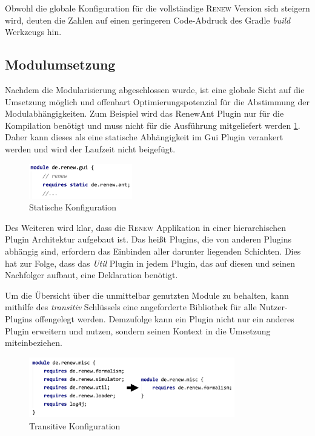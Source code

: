 	Obwohl die globale Konfiguration für die vollständige \textsc{Renew} Version sich steigern wird, deuten die Zahlen auf einen geringeren Code-Abdruck des Gradle \textit{build} Werkzeugs hin.\bigbreak

\subsection{Modulumsetzung} \label{sub:optimierung}%
	Nachdem die Modularisierung abgeschlossen wurde, ist eine globale Sicht auf die Umsetzung möglich und offenbart Optimierungspotenzial für die Abstimmung der Modulabhängigkeiten. Zum Beispiel wird das RenewAnt Plugin nur für die Kompilation benötigt und muss nicht für die Ausführung mitgeliefert werden \ref{fig:remote_config}. Daher kann dieses als eine statische Abhängigkeit im Gui Plugin verankert werden und wird der Laufzeit nicht beigefügt.\bigbreak

	\begin{figure}[h!]
	  \centering
	  \includegraphics[width=0.4\textwidth]{material/images/gui_config.png}
	  \caption{Statische Konfiguration}
	  \label{fig:remote_config}
	\end{figure}

	Des Weiteren wird klar, dass die \textsc{Renew} Applikation in einer hierarchischen Plugin Architektur aufgebaut ist. Das heißt Plugins, die von anderen Plugins abhängig sind, erfordern das Einbinden aller darunter liegenden Schichten. Dies hat zur Folge, dass das \textit{Util} Plugin in jedem Plugin, das auf diesen und seinen Nachfolger aufbaut, eine Deklaration benötigt. \newline

	Um die Übersicht über die unmittelbar genutzten Module zu behalten, kann mithilfe des \textit{transitiv}  Schlüssels eine angeforderte Bibliothek für alle Nutzer-Plugins offengelegt werden. Demzufolge kann ein Plugin nicht nur ein anderes Plugin erweitern und nutzen, sondern seinen Kontext in die Umsetzung miteinbeziehen. \bigbreak

	\begin{figure}[h!]
	  \centering
	  \includegraphics[width=0.8\textwidth]{material/images/misc_trans.png}
	  \caption{Transitive Konfiguration}
	  \label{fig:trans_config}
	\end{figure}

